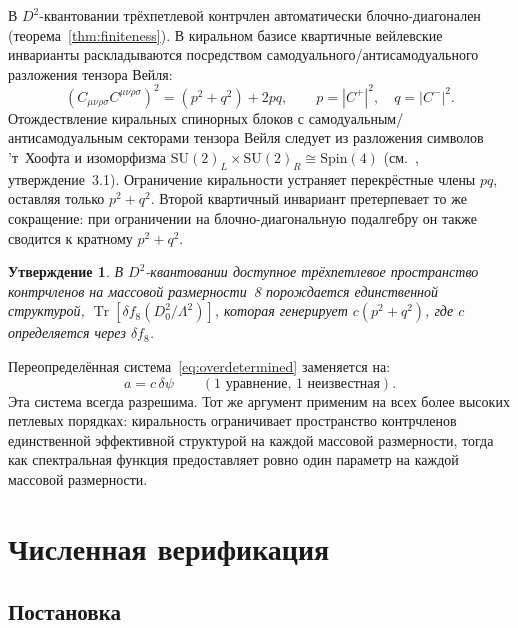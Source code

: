 \documentclass[12pt,a4paper]{article}
\newtheorem{proposition}[theorem]{Утверждение}
\theoremstyle{definition}
\theoremstyle{remark}
\newcommand{\Weylsq}{C_{\mu\nu\rho\sigma}C^{\mu\nu\rho\sigma}}
\newcommand{\Tr}{\operatorname{Tr}}
\newcommand{\Lam}{\Lambda}
\begin{document}
В $D^2$-квантовании трёхпетлевой контрчлен автоматически
блочно-диагонален (теорема~\ref{thm:finiteness}).  В киральном базисе
квартичные вейлевские инварианты раскладываются посредством
самодуального/антисамодуального разложения тензора Вейля:
\begin{equation}\label{eq:quartic_chiral}
  (\Weylsq)^2 = (p^2 + q^2) + 2pq, \qquad
  p = |C^+|^2, \quad q = |C^-|^2.
\end{equation}
Отождествление киральных спинорных блоков с
самодуальным/антисамодуальным секторами тензора Вейля следует из
разложения символов 'т~Хоофта и изоморфизма
$\mathrm{SU}(2)_L \times \mathrm{SU}(2)_R \cong \mathrm{Spin}(4)$
(см.~\cite{Alfyorov:2026ct}, утверждение~3.1).
Ограничение киральности устраняет перекрёстные члены $pq$, оставляя
только $p^2 + q^2$.  Второй квартичный инвариант претерпевает то же
сокращение: при ограничении на блочно-диагональную подалгебру он также
сводится к кратному $p^2 + q^2$.

\begin{proposition}\label{prop:one_structure}
В $D^2$-квантовании доступное трёхпетлевое пространство контрчленов на
массовой размерности~8 порождается единственной структурой,
$\Tr[\delta f_8(D_0^2/\Lam^2)]$, которая генерирует $c(p^2 + q^2)$,
где $c$ определяется через $\delta f_8$.
\end{proposition}

Переопределённая система~\eqref{eq:overdetermined} заменяется на:
\begin{equation}\label{eq:determined}
  a = c\,\delta\psi \qquad (1\text{ уравнение, }1\text{ неизвестная}).
\end{equation}
Эта система всегда разрешима.  Тот же аргумент применим на всех более
высоких петлевых порядках: киральность ограничивает пространство
контрчленов единственной эффективной структурой на каждой массовой
размерности, тогда как спектральная функция предоставляет ровно один
параметр на каждой массовой размерности.

\section{Численная верификация}
\label{sec:numerics}

\subsection{Постановка}
\end{document}
